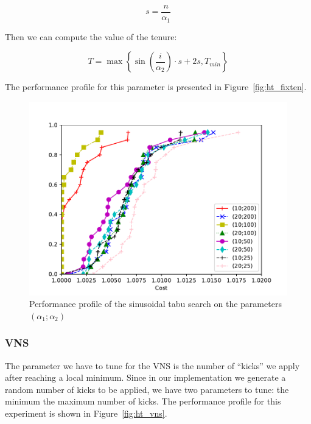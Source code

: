 \documentclass{article}
\begin{document}
\begin{equation*}
        s = \frac{n}{\alpha_1}
\end{equation*}

Then we can compute the value of the tenure:

\begin{equation*}
        T = \max \left\{
                \sin \left( \frac{i}{\alpha_2} \right) \cdot s + 2 s ,
                T_{min}
        \right\}
\end{equation*}

The performance profile for this parameter is presented in Figure~\ref{fig:ht_fixten}.

\begin{figure}[ht]
        \caption{Performance profile of the sinusoidal tabu search on the parameters $\left(\alpha_1; \alpha_2\right)$}
        \label{fig:ht_sinten}
        \centering
        \includegraphics[width=340pt]{assets/ht_sinten.pdf}
\end{figure}

\clearpage

\subsubsection{VNS}
The parameter we have to tune for the VNS is the number of ``kicks'' we apply
after reaching a local minimum. Since in our implementation we generate a
random number of kicks to be applied, we have two parameters to tune: the
minimum the maximum number of kicks.
The performance profile for this experiment is shown in Figure~\ref{fig:ht_vns}.
\end{document}
